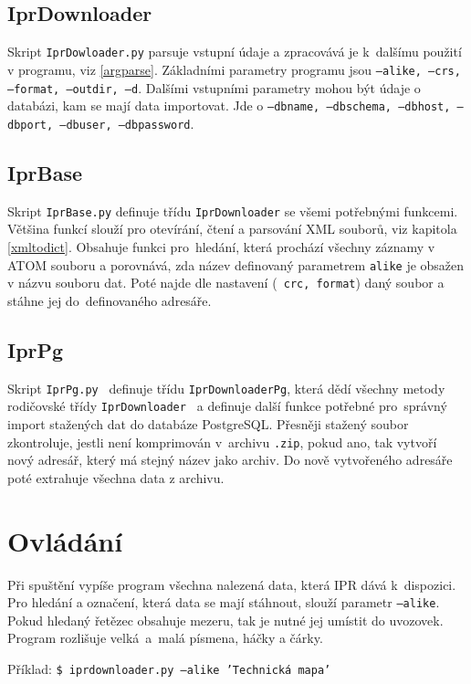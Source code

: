 \subsection{IprDownloader}
Skript {\tt IprDowloader.py} parsuje vstupní údaje a
zpracovává je k~dalšímu použití v programu, viz \ref{argparse}. Základními parametry programu jsou
{\tt ---alike, ---crs, ---format, ---outdir, ---d}.
Dalšími vstupními parametry mohou být údaje o databázi, kam se mají data
importovat. Jde o 
{\tt ---dbname, ---dbschema, ---dbhost, ---dbport, ---dbuser, ---dbpassword}.


\subsection{IprBase}
Skript {\tt IprBase.py} definuje třídu {\tt IprDownloader} se všemi
potřebnými funkcemi. Většina funkcí slouží pro otevírání, čtení a
parsování XML souborů, viz kapitola \ref{xmltodict}. Obsahuje funkci
pro~hledání, která prochází všechny záznamy v ATOM souboru a porovnává, zda název
definovaný parametrem {\tt alike} je obsažen v názvu souboru dat. Poté najde dle nastavení ({\tt
  crc, format}) daný soubor a stáhne jej do~definovaného adresáře.


\subsection{IprPg}
Skript {\tt IprPg.py } definuje třídu {\tt IprDownloaderPg}, která
dědí všechny metody rodičovské třídy {\tt IprDownloader } a definuje další
funkce potřebné pro~správný import stažených dat do databáze
PostgreSQL. Přesněji stažený soubor zkontroluje, jestli není 
komprimován v~archivu {\tt *.zip}, pokud ano, tak vytvoří nový adresář,
který má stejný název jako archiv. Do nově vytvořeného adresáře poté 
extrahuje všechna data z archivu.


\section{Ovládání}
Při spuštění vypíše program všechna nalezená data,
která IPR dává k~dispozici. Pro hledání a označení, která data se mají
stáhnout, slouží parametr {\tt ---alike}. Pokud hledaný řetězec obsahuje mezeru,
tak je nutné jej umístit do uvozovek. Program rozlišuje velká~a~malá
písmena, háčky a čárky.

Příklad: {\tt \$ iprdownloader.py ---alike 'Technická mapa'}

